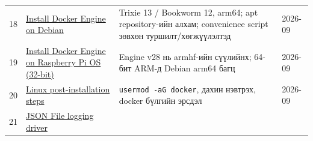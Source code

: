 \begin{longtable}[]{@{}llll@{}}
\begin{minipage}[t]{0.22\columnwidth}
18\strut
\end{minipage} & \begin{minipage}[t]{0.22\columnwidth}\raggedright
\href{https://docs.docker.com/engine/install/debian/}{Install Docker Engine on Debian}\strut
\end{minipage} & \begin{minipage}[t]{0.22\columnwidth}\raggedright
Trixie 13 / Bookworm 12, arm64; apt repository-ийн алхам; convenience script зөвхөн туршилт/хөгжүүлэлтэд\strut
\end{minipage} & \begin{minipage}[t]{0.22\columnwidth}\raggedright
2026-09\strut
\end{minipage}\tabularnewline
\begin{minipage}[t]{0.22\columnwidth}\raggedright
19\strut
\end{minipage} & \begin{minipage}[t]{0.22\columnwidth}\raggedright
\href{https://docs.docker.com/engine/install/raspberry-pi-os/}{Install Docker Engine on Raspberry Pi OS (32-bit)}\strut
\end{minipage} & \begin{minipage}[t]{0.22\columnwidth}\raggedright
Engine v28 нь armhf-ийн сүүлийнх; 64-бит ARM-д Debian arm64 багц\strut
\end{minipage} & \begin{minipage}[t]{0.22\columnwidth}\raggedright
2026-09\strut
\end{minipage}\tabularnewline
\begin{minipage}[t]{0.22\columnwidth}\raggedright
20\strut
\end{minipage} & \begin{minipage}[t]{0.22\columnwidth}\raggedright
\href{https://docs.docker.com/engine/install/linux-postinstall/}{Linux post-installation steps}\strut
\end{minipage} & \begin{minipage}[t]{0.22\columnwidth}\raggedright
\texttt{usermod\ -aG\ docker}, дахин нэвтрэх, docker бүлгийн эрсдэл\strut
\end{minipage} & \begin{minipage}[t]{0.22\columnwidth}\raggedright
2026-09\strut
\end{minipage}\tabularnewline
\begin{minipage}[t]{0.22\columnwidth}\raggedright
21\strut
\end{minipage} & \begin{minipage}[t]{0.22\columnwidth}\raggedright
\href{https://docs.docker.com/engine/logging/drivers/json-file/}{JSON File logging driver}\strut

\end{minipage}
\end{longtable}
